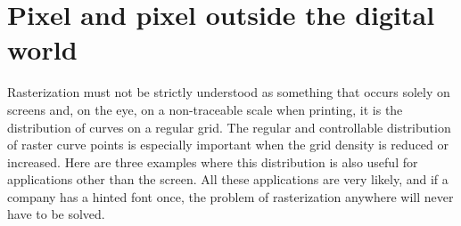 \documentclass[a4paper]{article}
\begin{document}
\section{Pixel and pixel outside the digital world}
Rasterization must not be strictly understood as something that occurs solely on screens and, on the eye, on a non-traceable scale when printing, it is the distribution of curves on a regular grid. The regular and controllable distribution of raster curve points is especially important when the grid density is reduced or increased. Here are three examples where this distribution is also useful for applications other than the screen. All these applications are very likely, and if a company has a hinted font once, the problem of rasterization anywhere will never have to be solved. \\
\end{document}
